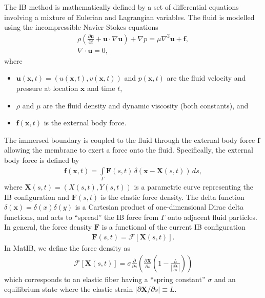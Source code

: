 \documentclass{article}
\newcommand{\Laplacian}{\nabla^2}
\newcommand{\bs}[1]{\boldsymbol{#1}}
\newcommand{\brac}[1]{\left(#1 \right)}
\newcommand{\pd}[2]{\frac{\partial #1}{\partial #2}}
\newcommand{\eqmstrain}{L}
\begin{document}
The IB method is mathematically defined by a set of differential equations involving a mixture of Eulerian and Lagrangian variables.
The fluid is modelled using the incompressible Navier-Stokes equations
\begin{gather}
  \label{eq:NSE}
  \rho \brac{\pd{\bs{u}}{t} + \bs{u}\cdot\nabla\bs{u}} + \nabla p = \mu 
  \Laplacian \bs{u} + \bs{f}, 
  \\
  \label{eq:incompressible}
  \nabla \cdot \bs{u} = 0,
\end{gather}
where 
\begin{itemize}
\item $\bs{u}(\bs{x},t)=(u(\bs{x},t),v(\bs{x},t))$ and $p(\bs{x},t)$ are the fluid velocity and pressure at location $\bs{x}$ and time $t$,
\item $\rho$ and $\mu$ are the fluid density and dynamic viscosity (both constants), and
\item $\bs{f}(\bs{x},t)$ is the external body force.
\end{itemize}
The immersed boundary is coupled to the fluid through the external body force $\bs{f}$ allowing the membrane to exert a force onto the fluid.
Specifically, the external body force is defined by
\begin{gather}
  \label{eq:force}
  \bs{f}(\bs{x},t) = \int\limits_\Gamma \bs{F}(s,t) \, \delta(\bs{x} -
  \bs{X}(s,t)) \,ds, 
\end{gather}
where $\bs{X}(s,t)=(X(s,t), Y(s,t))$ is a parametric curve representing the IB configuration and 
$\bs{F}(s,t)$ is the elastic force density. The delta function $\delta(\bs{x}) = \delta(x)\delta(y)$ 
is a Cartesian product of one-dimensional Dirac delta functions, and acts to ``spread'' the IB
force from $\Gamma$ onto adjacent fluid particles. In general, the
force density $\bs{F}$ is a functional of the current IB configuration
\begin{gather}
  \label{eq:forceDensity}
  \bs{F}(s,t) = \bs{\mathcal{F}} \left[\bs{X}(s,t)\right].
\end{gather}
In MatIB, we define the force density as
\begin{gather}
  \label{eq:forceDensityDefinition}
  \bs{\mathcal{F}}[\bs{X}(s,t)] = \sigma \pd{ }{s}\brac{\pd{\bs{X}}{s}
    \brac{ 1 - \frac{\eqmstrain}{|\pd{\bs{X}}{s}|} }} 
\end{gather}
which corresponds to an elastic fiber having a ``spring constant''
$\sigma$ and an equilibrium state where the elastic strain $|\partial
\bs{X} / \partial s| \equiv \eqmstrain$.
\end{document}
